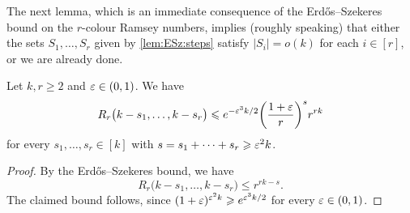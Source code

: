The next lemma, which is an immediate consequence of the Erd\H{o}s--Szekeres bound on the \(r\)-colour Ramsey numbers, implies (roughly speaking) that either the sets \(S_1,\dots,S_r\) given by \autoref{lem:ESz:steps} satisfy \(|S_i| = o(k)\) for each \(i \in [r]\), or we are already done.
%
\begin{lemma}
  \label{lem:many:ESz:steps} %
  Let \(k,r \ge 2\) and \(\varepsilon \in (0,1)\). We have 
  \begin{equation*}
    R_r\big( k - s_1, \ldots, k - s_r \big) \leqslant e^{-\varepsilon^3 k / 2} \bigg( \frac{1+\varepsilon}{r} \bigg)^s r^{rk}
  \end{equation*}
  for every \(s_1,\ldots,s_r \in [k]\) with \(s = s_1 + \cdots + s_r \geqslant \varepsilon^2 k\).
\end{lemma}
%
\begin{proof}
  By the Erd\H{o}s--Szekeres bound, we have
  \begin{equation*}
    R_r\big( k - s_1, \ldots, k - s_r \big) \le r^{rk - s}.
  \end{equation*}
  The claimed bound follows, since \(( 1 + \varepsilon )^{\varepsilon^2 k} \geqslant e^{\varepsilon^3 k/2}\) for every \(\varepsilon \in (0,1)\).
\end{proof}

